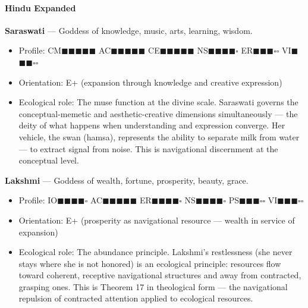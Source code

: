 \paragraph*{Hindu Expanded}


\textbf{Saraswati} — Goddess of knowledge, music, arts, learning, wisdom.

\begin{itemize}[nosep,leftmargin=*]
  \item Profile: CM$\blacksquare$$\blacksquare$$\blacksquare$$\blacksquare$$\blacksquare$ AC$\blacksquare$$\blacksquare$$\blacksquare$$\blacksquare$$\blacksquare$ CE$\blacksquare$$\blacksquare$$\blacksquare$$\blacksquare$$\blacksquare$ NS$\blacksquare$$\blacksquare$$\blacksquare$$\blacksquare$$\square$ ER$\blacksquare$$\blacksquare$$\blacksquare$$\square$$\square$ VI$\blacksquare$$\blacksquare$$\blacksquare$$\square$$\square$
  \item Orientation: E+ (expansion through knowledge and creative expression)
  \item Ecological role: The muse function at the divine scale. Saraswati governs the conceptual-memetic and aesthetic-creative dimensions simultaneously — the deity of what happens when understanding and expression converge. Her vehicle, the swan (hamsa), represents the ability to separate milk from water — to extract signal from noise. This is navigational discernment at the conceptual level.
\end{itemize}


\textbf{Lakshmi} — Goddess of wealth, fortune, prosperity, beauty, grace.

\begin{itemize}[nosep,leftmargin=*]
  \item Profile: IO$\blacksquare$$\blacksquare$$\blacksquare$$\blacksquare$$\square$ AC$\blacksquare$$\blacksquare$$\blacksquare$$\blacksquare$$\blacksquare$ ER$\blacksquare$$\blacksquare$$\blacksquare$$\blacksquare$$\square$ NS$\blacksquare$$\blacksquare$$\blacksquare$$\blacksquare$$\square$ PS$\blacksquare$$\blacksquare$$\blacksquare$$\square$$\square$ VI$\blacksquare$$\blacksquare$$\blacksquare$$\square$$\square$
  \item Orientation: E+ (prosperity as navigational resource — wealth in service of expansion)
  \item Ecological role: The abundance principle. Lakshmi's restlessness (she never stays where she is not honored) is an ecological principle: resources flow toward coherent, receptive navigational structures and away from contracted, grasping ones. This is Theorem 17 in theological form — the navigational repulsion of contracted attention applied to ecological resources.
\end{itemize}


